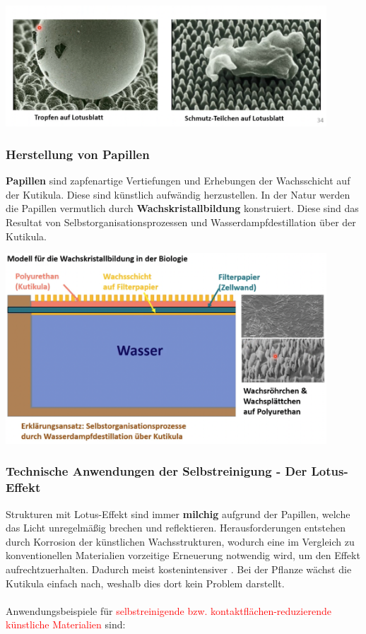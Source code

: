 \begin{center}
	\includegraphics[width=12cm]{lec2/figures/selbstreinigung.png}	
\end{center}

\subsubsection{Herstellung von Papillen}

\textbf{Papillen} sind zapfenartige Vertiefungen und Erhebungen der Wachsschicht auf der Kutikula. Diese sind künstlich aufwändig herzustellen. In der Natur werden die Papillen vermutlich durch \textbf{Wachskristallbildung} konstruiert. Diese sind das Resultat von Selbstorganisationsprozessen und Wasserdampfdestillation über der Kutikula.

\begin{center}
	\includegraphics[width=12cm]{lec2/figures/wachskristallbildung.png}	
\end{center}
\subsubsection{Technische Anwendungen der Selbstreinigung - Der Lotus-Effekt}

Strukturen mit Lotus-Effekt sind immer \textbf{milchig} aufgrund der Papillen, welche das Licht unregelmäßig brechen und reflektieren. Herausforderungen entstehen durch Korrosion der künstlichen Wachsstrukturen, wodurch eine im Vergleich zu konventionellen Materialien vorzeitige Erneuerung notwendig wird, um den Effekt aufrechtzuerhalten. Dadurch meist kostenintensiver \dangersign. Bei der Pflanze wächst die Kutikula einfach nach, weshalb dies dort kein Problem darstellt.
\\\\
Anwendungsbeispiele für \textcolor{red}{selbstreinigende bzw. kontaktflächen-reduzierende künstliche Materialien} sind:

